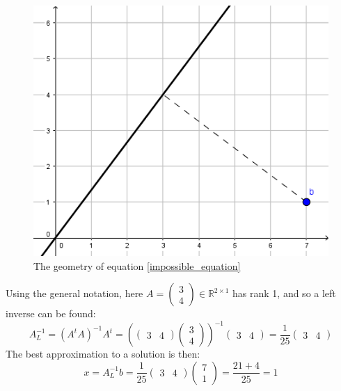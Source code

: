 \documentclass[12pt, a4paper]{article}
\numberwithin{equation}{section}
\begin{document}
\begin{figure}
\centering
\includegraphics[width=\textwidth]{left_inverse}
\caption{The geometry of equation \ref{impossible_equation}}
\label{fig:left_inverse}
\end{figure}

Using the general notation, here $A=\begin{pmatrix}3 \\ 4\end{pmatrix}\in\mathbb{R}^{2\times 1}$ has rank 1, and so a left inverse can be found:
\begin{equation}
A^{-1}_L=(A^t A)^{-1}A^t=\left(\begin{pmatrix}3 & 4\end{pmatrix}\begin{pmatrix}3 \\ 4\end{pmatrix}\right)^{-1}\begin{pmatrix}3 & 4\end{pmatrix}=\frac{1}{25}\begin{pmatrix}3 & 4\end{pmatrix}
\end{equation}
The best approximation to a solution is then:
\begin{equation}
x=A^{-1}_L b=\frac{1}{25}\begin{pmatrix}3 & 4\end{pmatrix}\begin{pmatrix}7 \\ 1\end{pmatrix}=\frac{21+4}{25}=1
\end{equation}
\end{document}
